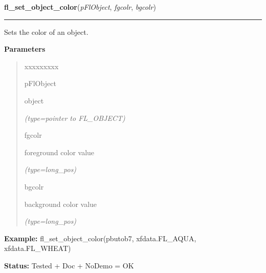     \label{xformslib:flbasic:fl_set_object_color}

    \vspace{0.5ex}

\hspace{.8\funcindent}\begin{boxedminipage}{\funcwidth}

    \raggedright \textbf{fl\_set\_object\_color}(\textit{pFlObject}, \textit{fgcolr}, \textit{bgcolr})

    \vspace{-1.5ex}

    \rule{\textwidth}{0.5\fboxrule}
\setlength{\parskip}{2ex}
    Sets the color of an object.

\setlength{\parskip}{1ex}
      \textbf{Parameters}
      \vspace{-1ex}

      \begin{quote}
        \begin{Ventry}{xxxxxxxxx}

          \item[pFlObject]

          object

            {\it (type=pointer to FL\_OBJECT)}

          \item[fgcolr]

          foreground color value

            {\it (type=long\_pos)}

          \item[bgcolr]

          background color value

            {\it (type=long\_pos)}

        \end{Ventry}

      \end{quote}

\textbf{Example:} fl\_set\_object\_color(pbutob7, xfdata.FL\_AQUA, xfdata.FL\_WHEAT)



\textbf{Status:} Tested + Doc + NoDemo = OK



    \end{boxedminipage}

    \label{xformslib:flbasic:fl_get_object_color}

